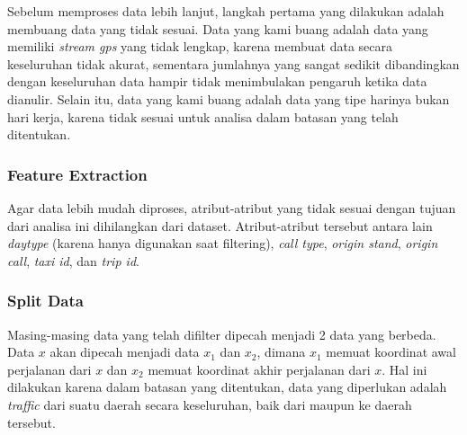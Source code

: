 \documentclass{article}
\begin{document}
\begin{adjustwidth}{4em}{0pt}
	
\hspace{\parindent}Sebelum memproses data lebih lanjut, langkah pertama yang dilakukan adalah membuang data yang tidak sesuai. Data yang kami buang adalah data yang memiliki \textit{stream gps} yang tidak lengkap, karena membuat data secara keseluruhan tidak akurat, sementara jumlahnya yang sangat sedikit dibandingkan dengan keseluruhan data hampir tidak menimbulakan pengaruh ketika data dianulir. Selain itu, data yang kami buang adalah data yang tipe harinya bukan hari kerja, karena tidak sesuai untuk analisa dalam batasan yang telah ditentukan.

\end{adjustwidth}

\subsubsection{Feature Extraction}

\begin{adjustwidth}{4em}{0pt}
	
	\hspace{\parindent}Agar data lebih mudah diproses, atribut-atribut yang tidak sesuai dengan tujuan dari analisa ini dihilangkan dari dataset. Atribut-atribut tersebut antara lain \textit{daytype} (karena hanya digunakan saat filtering), \textit{call type}, \textit{origin stand}, \textit{origin call}, \textit{taxi id}, dan \textit{trip id}.
	
\end{adjustwidth}

\subsubsection{Split Data}

\begin{adjustwidth}{4em}{0pt}
	
	\hspace{\parindent}Masing-masing data yang telah difilter dipecah menjadi 2 data yang berbeda. Data $x$ akan dipecah menjadi data $x_1$ dan $x_2$, dimana $x_1$ memuat koordinat awal perjalanan dari $x$ dan $x_2$ memuat koordinat akhir perjalanan dari $x$. Hal ini dilakukan karena dalam batasan yang ditentukan, data yang diperlukan adalah \textit{traffic} dari suatu daerah secara keseluruhan, baik dari maupun ke daerah tersebut.
	
\end{adjustwidth}
\end{document}
